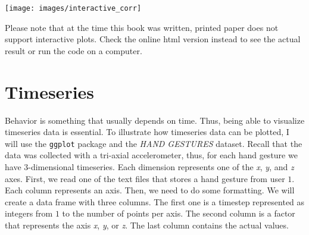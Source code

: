 \documentclass[
  11pt,
]{krantz}
\makeatletter
\newenvironment{kframe}{%
\medskip{}
\setlength{\fboxsep}{.8em}
 \def\at@end@of@kframe{}%
 \ifinner\ifhmode%
  \def\at@end@of@kframe{\end{minipage}}%
  \begin{minipage}{\columnwidth}%
 \fi\fi%
 \def\FrameCommand##1{\hskip\@totalleftmargin \hskip-\fboxsep
 \colorbox{shadecolor}{##1}\hskip-\fboxsep
     \hskip-\linewidth \hskip-\@totalleftmargin \hskip\columnwidth}%
 \MakeFramed {\advance\hsize-\width
   \@totalleftmargin\z@ \linewidth\hsize
   \@setminipage}}%
 {\par\unskip\endMakeFramed%
 \at@end@of@kframe}
\newenvironment{rmdblock}[1]
  {
  \begin{itemize}
  \renewcommand{\labelitemi}{
    \raisebox{-.7\height}[0pt][0pt]{
      {\setkeys{Gin}{width=3em,keepaspectratio}\texttt{[image: images/icons/\#1]}}
    }
  }
  \setlength{\fboxsep}{1em}
  \begin{kframe}
  \item
  }
  {
  \end{kframe}
  \end{itemize}
  }
\newenvironment{rmdinfo}
  {\begin{rmdblock}{info}}
  {\end{rmdblock}}
\makeatother
\begin{document}
\begin{center}\texttt{[image: images/interactive\_corr]} \end{center}

\begin{rmdinfo}
Please note that at the time this book was written, printed paper does not support interactive plots. Check the online html version instead to see the actual result or run the code on a computer.
\end{rmdinfo}

\hypertarget{timeseries}{%
\section{Timeseries}\label{timeseries}}

Behavior is something that usually depends on time. Thus, being able to visualize timeseries data is essential. To illustrate how timeseries data can be plotted, I will use the \texttt{ggplot} package and the \emph{HAND GESTURES} dataset. Recall that the data was collected with a tri-axial accelerometer, thus, for each hand gesture we have \(3\)-dimensional timeseries. Each dimension represents one of the \emph{x}, \emph{y}, and \emph{z} axes. First, we read one of the text files that stores a hand gesture from user \(1\). Each column represents an axis. Then, we need to do some formatting. We will create a data frame with three columns. The first one is a timestep represented as integers from \(1\) to the number of points per axis. The second column is a factor that represents the axis \emph{x}, \emph{y}, or \emph{z}. The last column contains the actual values.
\end{document}
